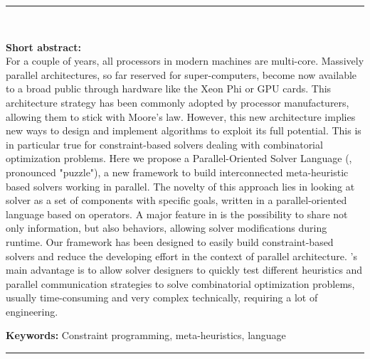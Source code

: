 \cleardoublepage
\begin{vcentrepage}
\noindent\rule[2pt]{\textwidth}{0.8pt}\\
\begin{center}
{\Large\textbf{\titre}}
\end{center}
{\large\textbf{Short abstract:}\\}
For a couple of years, all processors in modern machines are multi-core. Massively parallel architectures, so far reserved for super-computers, become now available to a broad public through hardware like the Xeon Phi or GPU cards. This architecture strategy has been commonly adopted by processor manufacturers, allowing them to stick with Moore's law. However, this new architecture implies new ways to design and implement algorithms to exploit its full potential. This is in particular true for constraint-based solvers dealing with combinatorial optimization problems. Here we propose a Parallel-Oriented Solver Language (\af{}, pronounced "puzzle"), a new framework to build interconnected meta-heuristic based solvers working in parallel. The novelty of this approach lies in looking at solver as a set of components with specific goals, written in a parallel-oriented language based on operators. A major feature in \af{} is the possibility to share not only information, but also behaviors, allowing solver modifications during runtime. Our framework has been designed to easily build constraint-based solvers and reduce the developing effort in the context of parallel architecture. \af{}'s main advantage is to allow solver designers to quickly test different heuristics and parallel communication strategies to solve combinatorial optimization problems, usually time-consuming and very complex technically, requiring a lot of engineering.

{\large\textbf{Keywords:}}
Constraint programming, meta-heuristics, language

\noindent\rule[2pt]{\textwidth}{0.8pt}
\end{vcentrepage}
